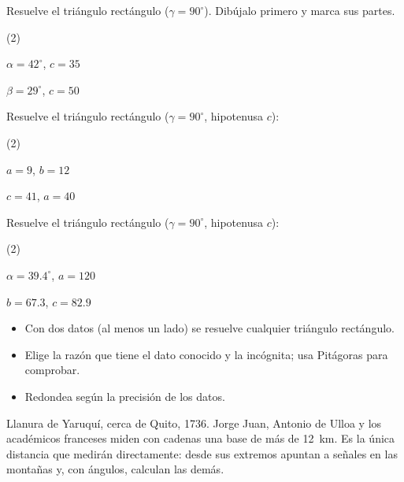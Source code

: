 \documentclass[11pt]{article}
\begin{document}
\begin{preguntas}
\pregunta Resuelve el triángulo rectángulo ($\gamma = 90^\circ$). Dibújalo primero y
marca sus partes.
\begin{opciones*}(2)
  \item $\alpha = 42^\circ$, $c = 35$
  \item $\beta = 29^\circ$, $c = 50$
\end{opciones*}
\espacio{3.5cm}
\pregunta Resuelve el triángulo rectángulo ($\gamma = 90^\circ$, hipotenusa $c$):
\begin{opciones*}(2)
  \item $a = 9$, $b = 12$
  \item $c = 41$, $a = 40$
\end{opciones*}
\espacio{3.5cm}
\pregunta Resuelve el triángulo rectángulo ($\gamma = 90^\circ$, hipotenusa $c$):
\begin{opciones*}(2)
  \item $\alpha = \num{39,4}^\circ$, $a = 120$
  \item $b = \num{67,3}$, $c = \num{82,9}$
\end{opciones*}
\espacio{3.5cm}
\end{preguntas}

\begin{resumen}
\begin{itemize}
  \item Con dos datos (al menos un lado) se resuelve cualquier triángulo rectángulo.
  \item Elige la razón que tiene el dato conocido y la incógnita; usa Pitágoras para comprobar.
  \item Redondea según la precisión de los datos.
\end{itemize}
\end{resumen}

\label{tema:aplicaciones}

\begin{hilo}
Llanura de Yaruquí, cerca de Quito, 1736. Jorge Juan, Antonio de Ulloa y los
académicos franceses miden con cadenas una base de más de 12~km. Es la única
distancia que medirán directamente: desde sus extremos apuntan a señales en
las montañas y, con ángulos, calculan las demás.
\end{hilo}
\end{document}
